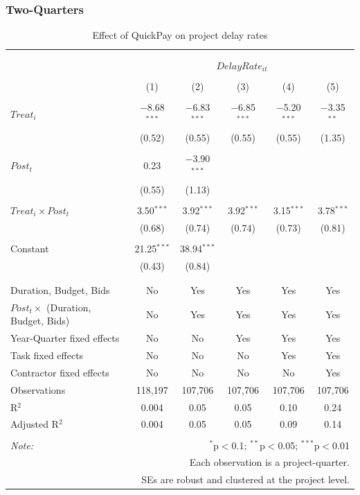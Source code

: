\documentclass[
]{article}
\begin{document}
\hypertarget{two-quarters-2}{%
\subsubsection{Two-Quarters}\label{two-quarters-2}}

\begin{table}[H] \centering 
  \caption{Effect of QuickPay on project delay rates} 
  \label{} 
\small 
\begin{tabular}{@{\extracolsep{-2pt}}lccccc} 
\\[-1.8ex]\hline 
\hline \\[-1.8ex] 
\\[-1.8ex] & \multicolumn{5}{c}{$DelayRate_{it}$} \\ 
\\[-1.8ex] & (1) & (2) & (3) & (4) & (5)\\ 
\hline \\[-1.8ex] 
 $Treat_i$ & $-$8.68$^{***}$ & $-$6.83$^{***}$ & $-$6.85$^{***}$ & $-$5.20$^{***}$ & $-$3.35$^{**}$ \\ 
  & (0.52) & (0.55) & (0.55) & (0.55) & (1.35) \\ 
  & & & & & \\ 
 $Post_t$ & 0.23 & $-$3.90$^{***}$ &  &  &  \\ 
  & (0.55) & (1.13) &  &  &  \\ 
  & & & & & \\ 
 $Treat_i \times Post_t$ & 3.50$^{***}$ & 3.92$^{***}$ & 3.92$^{***}$ & 3.15$^{***}$ & 3.78$^{***}$ \\ 
  & (0.68) & (0.74) & (0.74) & (0.73) & (0.81) \\ 
  & & & & & \\ 
 Constant & 21.25$^{***}$ & 38.94$^{***}$ &  &  &  \\ 
  & (0.43) & (0.84) &  &  &  \\ 
  & & & & & \\ 
\hline \\[-1.8ex] 
Duration, Budget, Bids & No & Yes & Yes & Yes & Yes \\ 
$Post_t \times$  (Duration, Budget, Bids) & No & Yes & Yes & Yes & Yes \\ 
Year-Quarter fixed effects & No & No & Yes & Yes & Yes \\ 
Task fixed effects & No & No & No & Yes & Yes \\ 
Contractor fixed effects & No & No & No & No & Yes \\ 
Observations & 118,197 & 107,706 & 107,706 & 107,706 & 107,706 \\ 
R$^{2}$ & 0.004 & 0.05 & 0.05 & 0.10 & 0.24 \\ 
Adjusted R$^{2}$ & 0.004 & 0.05 & 0.05 & 0.09 & 0.14 \\ 
\hline 
\hline \\[-1.8ex] 
\textit{Note:}  & \multicolumn{5}{r}{$^{*}$p$<$0.1; $^{**}$p$<$0.05; $^{***}$p$<$0.01} \\ 
 & \multicolumn{5}{r}{Each observation is a project-quarter.} \\ 
 & \multicolumn{5}{r}{SEs are robust and clustered at the project level.} \\ 
\end{tabular} 
\end{table}
\end{document}
